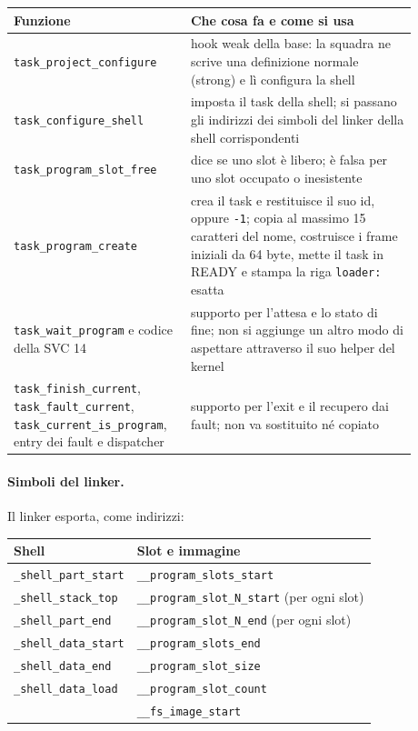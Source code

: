 \begin{center}
\small
\begin{tabular}{|p{0.36\linewidth}|p{0.52\linewidth}|}
\hline
\raggedright Funzione & \raggedright Che cosa fa e come si usa \tabularnewline
\hline\hline
\raggedright \texttt{task\_project\_configure} & \raggedright hook weak della base: la squadra ne scrive una definizione normale (strong) e lì configura la shell \tabularnewline
\hline
\raggedright \texttt{task\_configure\_shell} & \raggedright imposta il task della shell; si passano gli indirizzi dei simboli del linker della shell corrispondenti \tabularnewline
\hline
\raggedright \texttt{task\_program\_slot\_free} & \raggedright dice se uno slot è libero; è falsa per uno slot occupato o inesistente \tabularnewline
\hline
\raggedright \texttt{task\_program\_create} & \raggedright crea il task e restituisce il suo id, oppure \texttt{-1}; copia al massimo 15 caratteri del nome, costruisce i frame iniziali da 64 byte, mette il task in READY e stampa la riga \texttt{loader:} esatta \tabularnewline
\hline
\raggedright \texttt{task\_wait\_program} e codice della SVC 14 & \raggedright supporto per l'attesa e lo stato di fine; non si aggiunge un altro modo di aspettare attraverso il suo helper del kernel \tabularnewline
\hline
\raggedright \texttt{task\_finish\_current}, \texttt{task\_fault\_current}, \texttt{task\_current\_is\_program}, entry dei fault e dispatcher & \raggedright supporto per l'exit e il recupero dai fault; non va sostituito né copiato \tabularnewline
\hline
\end{tabular}
\end{center}

\paragraph{Simboli del linker.} Il linker esporta, come indirizzi:

\begin{center}
\small
\begin{tabular}{|l|l|}
\hline
Shell & Slot e immagine \tabularnewline
\hline\hline
\texttt{\_shell\_part\_start} & \texttt{\_\_program\_slots\_start} \tabularnewline
\texttt{\_shell\_stack\_top} & \texttt{\_\_program\_slot\_N\_start} (per ogni slot) \tabularnewline
\texttt{\_shell\_part\_end} & \texttt{\_\_program\_slot\_N\_end} (per ogni slot) \tabularnewline
\texttt{\_shell\_data\_start} & \texttt{\_\_program\_slots\_end} \tabularnewline
\texttt{\_shell\_data\_end} & \texttt{\_\_program\_slot\_size} \tabularnewline
\texttt{\_shell\_data\_load} & \texttt{\_\_program\_slot\_count} \tabularnewline
 & \texttt{\_\_fs\_image\_start} \tabularnewline
\hline
\end{tabular}
\end{center}

